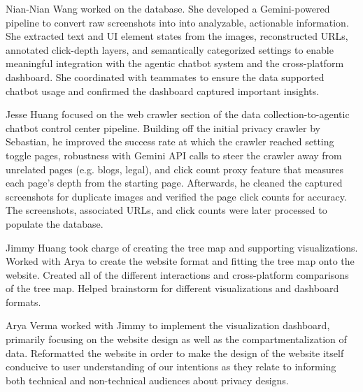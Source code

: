 \documentclass[12pt,letterpaper]{article}
\begin{document}
Nian-Nian Wang worked on the database. She developed a Gemini-powered pipeline to convert raw screenshots into into analyzable, actionable information. She extracted text and UI element states from the images, reconstructed URLs, annotated click-depth layers, and semantically categorized settings to enable meaningful integration with the agentic chatbot system and the cross-platform dashboard. She coordinated with teammates to ensure the data supported chatbot usage and confirmed the dashboard captured important insights.

Jesse Huang focused on the web crawler section of the data collection-to-agentic chatbot control center pipeline. Building off the initial privacy crawler by Sebastian, he improved the success rate at which the crawler reached setting toggle pages, robustness with Gemini API calls to steer the crawler away from unrelated pages (e.g. blogs, legal), and click count proxy feature that measures each page's depth from the starting page. Afterwards, he cleaned the captured screenshots for duplicate images and verified the page click counts for accuracy. The screenshots, associated URLs, and click counts were later processed to populate the database.

Jimmy Huang took charge of creating the tree map and supporting visualizations. Worked with Arya to create the website format and fitting the tree map onto the website. Created all of the different interactions and cross-platform comparisons of the tree map. Helped brainstorm for different visualizations and dashboard formats. 

Arya Verma worked with Jimmy to implement the visualization dashboard, primarily focusing on the website design as well as the compartmentalization of data. Reformatted the website in order to make the design of the website itself conducive to user understanding of our intentions as they relate to informing both technical and non-technical audiences about privacy designs.




\end{document}
